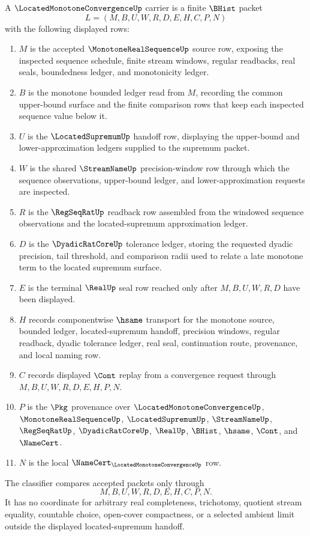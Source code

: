 \begin{definition}
\label{def:located-monotone-convergence-carrier}
A $\LocatedMonotoneConvergenceUp$ carrier is a finite $\BHist$ packet
$$
L=(M,B,U,W,R,D,E,H,C,P,N)
$$
with the following displayed rows:
\begin{enumerate}
\item $M$ is the accepted $\MonotoneRealSequenceUp$ source row, exposing the inspected sequence schedule, finite stream windows, regular readbacks, real seals, boundedness ledger, and monotonicity ledger.
\item $B$ is the monotone bounded ledger read from $M$, recording the common upper-bound surface and the finite comparison rows that keep each inspected sequence value below it.
\item $U$ is the $\LocatedSupremumUp$ handoff row, displaying the upper-bound and lower-approximation ledgers supplied to the supremum packet.
\item $W$ is the shared $\StreamNameUp$ precision-window row through which the sequence observations, upper-bound ledger, and lower-approximation requests are inspected.
\item $R$ is the $\RegSeqRatUp$ readback row assembled from the windowed sequence observations and the located-supremum approximation ledger.
\item $D$ is the $\DyadicRatCoreUp$ tolerance ledger, storing the requested dyadic precision, tail threshold, and comparison radii used to relate a late monotone term to the located supremum surface.
\item $E$ is the terminal $\RealUp$ seal row reached only after $M,B,U,W,R,D$ have been displayed.
\item $H$ records componentwise $\hsame$ transport for the monotone source, bounded ledger, located-supremum handoff, precision windows, regular readback, dyadic tolerance ledger, real seal, continuation route, provenance, and local naming row.
\item $C$ records displayed $\Cont$ replay from a convergence request through $M,B,U,W,R,D,E,H,P,N$.
\item $P$ is the $\Pkg$ provenance over $\LocatedMonotoneConvergenceUp$, $\MonotoneRealSequenceUp$, $\LocatedSupremumUp$, $\StreamNameUp$, $\RegSeqRatUp$, $\DyadicRatCoreUp$, $\RealUp$, $\BHist$, $\hsame$, $\Cont$, and $\NameCert$.
\item $N$ is the local $\NameCert_{\LocatedMonotoneConvergenceUp}$ row.
\end{enumerate}
The classifier compares accepted packets only through
$$
M,B,U,W,R,D,E,H,C,P,N.
$$
It has no coordinate for arbitrary real completeness, trichotomy, quotient stream equality, countable choice, open-cover compactness, or a selected ambient limit outside the displayed located-supremum handoff.
\end{definition}

